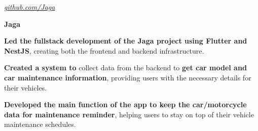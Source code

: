 \documentclass[../main.tex]{subfiles}
\begin{document}
\vspace{0.2 cm}

\begin{twocolentry}{
		\small

		\textit{\href{https://github.com/cattyman919/Jaga}{github.com/Jaga}}}
	\textbf{Jaga}
\end{twocolentry}

\vspace{0.10 cm}
\begin{onecolentry}
	\begin{highlights}
		\item \textbf{Led the fullstack development of the Jaga project using Flutter and NestJS}, creating both the frontend and backend infrastructure.
		\item \textbf{Created a system to} collect data from the backend to \textbf{get car model and car maintenance information}, providing users with the necessary details for their vehicles.
		\item \textbf{Developed the main function of the app to keep the car/motorcycle data for maintenance reminder}, helping users to stay on top of their vehicle maintenance schedules.
	\end{highlights}
\end{onecolentry}
\end{document}
